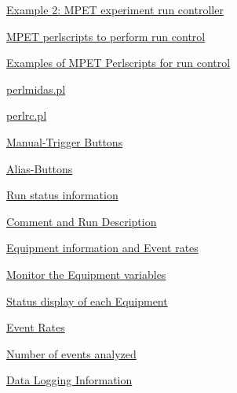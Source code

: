 \begin{TabularC}{2}
\begin{TabularC}{2}
\begin{DoxyItemize}
\begin{DoxyItemize}
\begin{DoxyItemize}
\begin{DoxyItemize}
\begin{DoxyItemize}
\begin{DoxyItemize}
\begin{DoxyItemize}
\begin{DoxyItemize}
\item \hyperlink{RC_mhttpd_defining_script_buttons_RC_odb_script_example2}{Example 2: MPET experiment run controller} 
\begin{DoxyItemize}
\item \hyperlink{RC_mhttpd_defining_script_buttons_RC_odb_script_ex2_perlscript}{MPET perlscripts to perform run control} 
\end{DoxyItemize}
\item \hyperlink{RC_mhttpd_perlrc}{Examples of MPET Perlscripts for run control} 
\begin{DoxyItemize}
\item \hyperlink{RC_mhttpd_perlrc_RC_mhttpd_perlmidas_script}{perlmidas.pl} 
\item \hyperlink{RC_mhttpd_perlrc_RC_mhttpd_perlrc_script}{perlrc.pl} 
\end{DoxyItemize}
\end{DoxyItemize}
\end{DoxyItemize}
\item \hyperlink{RC_mhttpd_status_page_features_RC_mhttpd_status_Manual_Trigger_buttons}{Manual-\/Trigger Buttons} 
\item \hyperlink{RC_mhttpd_status_page_features_RC_mhttpd_status_Alias_buttons}{Alias-\/Buttons} 
\end{DoxyItemize}
\item \hyperlink{RC_mhttpd_status_page_features_RC_mhttpd_status_Run_info}{Run status information} 
\item \hyperlink{RC_mhttpd_status_page_features_RC_Edit_RP}{Comment and Run Description} 
\item \hyperlink{RC_mhttpd_status_page_features_RC_mhttpd_status_Equipment_info}{Equipment information and Event rates} 
\begin{DoxyItemize}
\item \hyperlink{RC_mhttpd_status_page_features_RC_mhttpd_eq_variables}{Monitor the Equipment variables} 
\item \hyperlink{RC_mhttpd_status_page_features_RC_mhttpd_eq_status}{Status display of each Equipment} 
\item \hyperlink{RC_mhttpd_status_page_features_RC_mhttpd_status_Event_Rates}{Event Rates} 
\item \hyperlink{RC_mhttpd_status_page_features_RC_mhttpd_status_analyzer}{Number of events analyzed} 
\end{DoxyItemize}
\item \hyperlink{RC_mhttpd_status_page_features_RC_mhttpd_status_Logger}{Data Logging Information} 

\end{DoxyItemize}
\end{DoxyItemize}
\end{DoxyItemize}
\end{DoxyItemize}
\end{DoxyItemize}
\end{TabularC}
\end{TabularC}
